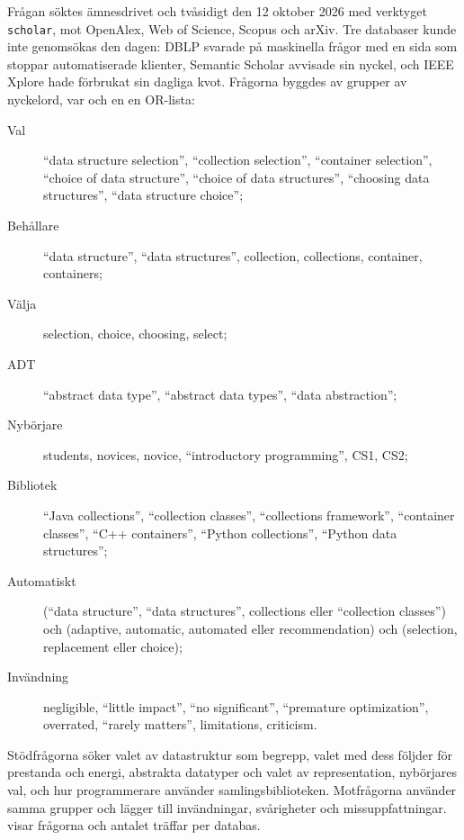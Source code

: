 Frågan söktes ämnesdrivet och tvåsidigt den 12 oktober 2026 med
verktyget \texttt{scholar}, mot OpenAlex, Web of Science, Scopus och
arXiv.  Tre databaser kunde inte genomsökas den dagen: DBLP svarade på
maskinella frågor med en sida som stoppar automatiserade klienter,
Semantic Scholar avvisade sin nyckel, och IEEE Xplore hade förbrukat
sin dagliga kvot.  Frågorna byggdes av grupper av nyckelord, var och en
en OR-lista:
\begin{description}
  \item[Val] \enquote{data structure selection}, \enquote{collection
    selection}, \enquote{container selection}, \enquote{choice of data
    structure}, \enquote{choice of data structures}, \enquote{choosing
    data structures}, \enquote{data structure choice};
  \item[Behållare] \enquote{data structure}, \enquote{data structures},
    collection, collections, container, containers;
  \item[Välja] selection, choice, choosing, select;
  \item[ADT] \enquote{abstract data type}, \enquote{abstract data
    types}, \enquote{data abstraction};
  \item[Nybörjare] students, novices, novice, \enquote{introductory
    programming}, CS1, CS2;
  \item[Bibliotek] \foreignlanguage{english}{\enquote{Java
      collections}, \enquote{collection classes}, \enquote{collections
      framework}, \enquote{container classes}, \enquote{C++
      containers}, \enquote{Python collections}, \enquote{Python data
      structures}};
  \item[Automatiskt] (\enquote{data structure}, \enquote{data
    structures}, collections eller \enquote{collection classes}) och
    (adaptive, automatic, automated eller recommendation) och
    (selection, replacement eller choice);
  \item[Invändning] negligible, \enquote{little impact}, \enquote{no
    significant}, \enquote{premature optimization}, overrated,
    \enquote{rarely matters}, limitations, criticism.
\end{description}
Stödfrågorna söker valet av datastruktur som begrepp, valet med dess
följder för prestanda och energi, abstrakta datatyper och valet av
representation, nybörjares val, och hur programmerare använder
samlingsbiblioteken.  Motfrågorna använder samma grupper och lägger till
invändningar, svårigheter och missuppfattningar.
 visar frågorna och antalet träffar per
databas.

